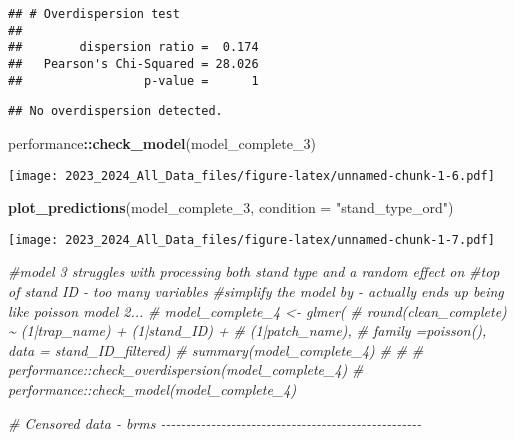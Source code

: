 \documentclass[
]{article}
\newenvironment{Shaded}{\begin{snugshade}}{\end{snugshade}}
\newcommand{\AttributeTok}[1]{\textcolor[rgb]{0.13,0.29,0.53}{#1}}
\newcommand{\CommentTok}[1]{\textcolor[rgb]{0.56,0.35,0.01}{\textit{#1}}}
\newcommand{\FunctionTok}[1]{\textcolor[rgb]{0.13,0.29,0.53}{\textbf{#1}}}
\newcommand{\NormalTok}[1]{#1}
\newcommand{\SpecialCharTok}[1]{\textcolor[rgb]{0.81,0.36,0.00}{\textbf{#1}}}
\newcommand{\StringTok}[1]{\textcolor[rgb]{0.31,0.60,0.02}{#1}}
\begin{document}
\begin{verbatim}
## # Overdispersion test
## 
##        dispersion ratio =  0.174
##   Pearson's Chi-Squared = 28.026
##                 p-value =      1
\end{verbatim}

\begin{verbatim}
## No overdispersion detected.
\end{verbatim}

\begin{Shaded}
\begin{Highlighting}[]
\NormalTok{performance}\SpecialCharTok{::}\FunctionTok{check\_model}\NormalTok{(model\_complete\_3)}
\end{Highlighting}
\end{Shaded}

\texttt{[image: 2023\_2024\_All\_Data\_files/figure-latex/unnamed-chunk-1-6.pdf]}

\begin{Shaded}
\begin{Highlighting}[]
\FunctionTok{plot\_predictions}\NormalTok{(model\_complete\_3, }\AttributeTok{condition =} \StringTok{"stand\_type\_ord"}\NormalTok{)}
\end{Highlighting}
\end{Shaded}

\texttt{[image: 2023\_2024\_All\_Data\_files/figure-latex/unnamed-chunk-1-7.pdf]}

\begin{Shaded}
\begin{Highlighting}[]
\CommentTok{\#model 3 struggles with processing both stand type and a random effect on}
\CommentTok{\#top of stand ID {-} too many variables}
\CommentTok{\#simplify the model by {-} actually ends up being like poisson model 2...}
\CommentTok{\# model\_complete\_4 \textless{}{-} glmer(}
\CommentTok{\#   round(clean\_complete) \textasciitilde{} (1|trap\_name) + (1|stand\_ID) + }
\CommentTok{\#     (1|patch\_name), }
\CommentTok{\#   family =poisson(), data = stand\_ID\_filtered)}
\CommentTok{\# summary(model\_complete\_4)}
\CommentTok{\# }
\CommentTok{\# }
\CommentTok{\# performance::check\_overdispersion(model\_complete\_4)}
\CommentTok{\# performance::check\_model(model\_complete\_4)}


\CommentTok{\# Censored data {-} brms {-}{-}{-}{-}{-}{-}{-}{-}{-}{-}{-}{-}{-}{-}{-}{-}{-}{-}{-}{-}{-}{-}{-}{-}{-}{-}{-}{-}{-}{-}{-}{-}{-}{-}{-}{-}{-}{-}{-}{-}{-}{-}{-}{-}{-}{-}{-}{-}{-}{-}{-}{-}}
\end{Highlighting}
\end{Shaded}
\end{document}
